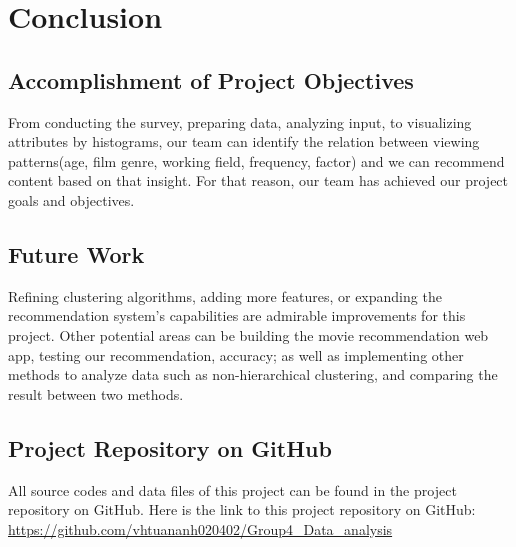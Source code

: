 \section{Conclusion}

    \subsection{Accomplishment of Project Objectives}
    From conducting the survey, preparing data, analyzing input, to visualizing attributes by histograms, our team can identify the relation between viewing patterns(age, film genre, working field, frequency, factor) and we can recommend content based on that insight. For that reason, our team has achieved our project goals and objectives.
    
    \subsection{Future Work}
    Refining clustering algorithms, adding more features, or expanding the recommendation system's capabilities are admirable improvements for this project. Other potential areas can be building the movie recommendation web app, testing our recommendation, accuracy; as well as implementing other methods to analyze data such as non-hierarchical clustering, and comparing the result between two methods. 

    \subsection{Project Repository on GitHub}
    All source codes and data files of this project can be found in the project repository on GitHub. Here is the link to this project repository on GitHub: \url{https://github.com/vhtuananh020402/Group4_Data_analysis}


    